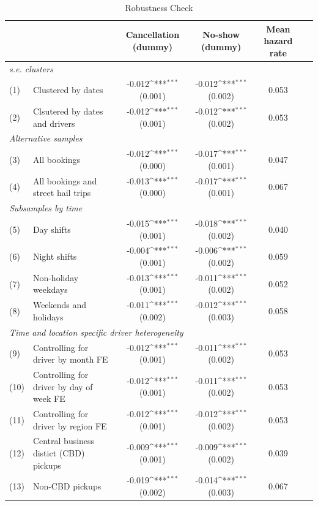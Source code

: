\documentclass[reviewmode,AEJ]{AEA}
\begin{document}
\begin{table}[]
    \centering
    \footnotesize
    \caption{Robustness Check}
    \def\sym#1{\ifmmode^{#1}\else\(^{#1}\)\fi}
    \begin{tabularx}{\textwidth}{ll@{\extracolsep{\fill}}*{4}{c}}
    	\toprule
    	\toprule
    	&      & Cancellation (dummy) & No-show (dummy) & Mean hazard rate \\
    	\midrule
    	\multicolumn{5}{l}{\textit{s.e. clusters}} \\
    	(1)  & Clustered by dates & -0.012\sym{***} (0.001) & -0.012\sym{***} (0.002) & 0.053 \\
    	(2)  & Clsutered by dates and drivers & -0.012\sym{***} (0.001) & -0.012\sym{***} (0.002) & 0.053 \\
    	\midrule
    	\multicolumn{5}{l}{\textit{Alternative samples}} \\
    	(3)  & All bookings & -0.012\sym{***} (0.000) & -0.017\sym{***} (0.001) & 0.047 \\
    	(4)  & All bookings and street hail trips & -0.013\sym{***} (0.000) & -0.017\sym{***} (0.001) & 0.067 \\
    	\midrule
    	\multicolumn{5}{l}{\textit{Subsamples by time}} \\
    	(5)  & Day shifts & -0.015\sym{***} (0.001) & -0.018\sym{***} (0.002) & 0.040 \\
    	(6)  & Night shifts & -0.004\sym{***} (0.001) & -0.006\sym{***} (0.002) & 0.059 \\
    	(7)  & Non-holiday weekdays & -0.013\sym{***} (0.001) & -0.011\sym{***} (0.002) & 0.052 \\
    	(8)  & Weekends and holidays & -0.011\sym{***} (0.002) & -0.012\sym{***} (0.003) & 0.058 \\
    	\midrule
    	\multicolumn{5}{l}{\textit{Time and location specific driver heterogeneity }} \\
    	(9)  & Controlling for driver by month FE & -0.012\sym{***} (0.001) & -0.011\sym{***} (0.002) & 0.053 \\
    	(10) & Controlling for driver by day of week FE & -0.012\sym{***} (0.001) & -0.011\sym{***} (0.002) & 0.053 \\
    	(11) & Controlling for driver by region FE & -0.012\sym{***} (0.001) & -0.012\sym{***} (0.002) & 0.053 \\
    	(12) & Central business distict (CBD) pickups & -0.009\sym{***} (0.001) & -0.009\sym{***} (0.002) & 0.039 \\
    	(13) & Non-CBD pickups & -0.019\sym{***} (0.002) & -0.014\sym{***} (0.003) & 0.067 \\

\end{tabularx}
\end{table}
\end{document}
